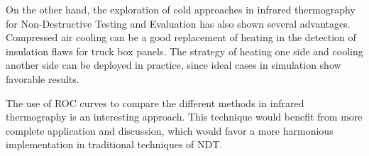 On the other hand, the exploration of cold approaches in infrared thermography for Non-Destructive Testing and Evaluation has also shown several advantages. Compressed air cooling can be a good replacement of heating in the detection of insulation flaws for truck box panels. The strategy of heating one side and cooling another side can be deployed in practice, since ideal cases in simulation show favorable results.

The use of ROC curves to compare the different methods in infrared thermography is an interesting approach. This technique would benefit from more complete application and discussion, which would favor a more harmonious implementation in traditional techniques of NDT.



